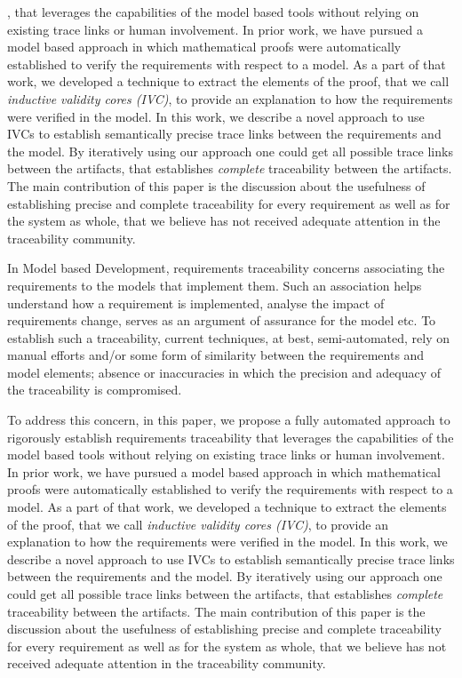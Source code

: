 , that leverages the capabilities of the model based tools without relying on existing trace links or human involvement. In prior work, we have pursued a model based approach in which mathematical proofs were automatically established to verify the requirements with respect to a model. As a part of that work, we developed a technique to extract the elements of the proof, that we call {\em inductive validity cores (IVC)}, to provide an explanation to how the requirements were verified in the model. In this work, we describe a novel approach to use IVCs to establish semantically precise trace links between the requirements and the model. By iteratively using our approach one could get all possible trace links between the artifacts, that establishes \emph{complete} traceability between the artifacts. The main contribution of this paper is the discussion about the usefulness of establishing precise and complete traceability for every requirement as well as for the system as whole, that we believe has not received adequate attention in the traceability community.



In Model based Development, requirements traceability concerns associating the requirements to the models that implement them. Such an association helps understand how a requirement is implemented, analyse the impact of requirements change, serves as an argument of assurance for the model etc. To establish such a traceability, current techniques, at best, semi-automated, rely on manual efforts and/or some form of similarity between the requirements and model elements; absence or inaccuracies in which the precision and adequacy of the traceability is compromised. 

To address this concern, in this paper, we propose a fully automated approach to rigorously establish requirements traceability that leverages the capabilities of the model based tools without relying on existing trace links or human involvement. In prior work, we have pursued a model based approach in which mathematical proofs were automatically established to verify the requirements with respect to a model. As a part of that work, we developed a technique to extract the elements of the proof, that we call {\em inductive validity cores (IVC)}, to provide an explanation to how the requirements were verified in the model. In this work, we describe a novel approach to use IVCs to establish semantically precise trace links between the requirements and the model. By iteratively using our approach one could get all possible trace links between the artifacts, that establishes \emph{complete} traceability between the artifacts. The main contribution of this paper is the discussion about the usefulness of establishing precise and complete traceability for every requirement as well as for the system as whole, that we believe has not received adequate attention in the traceability community.


